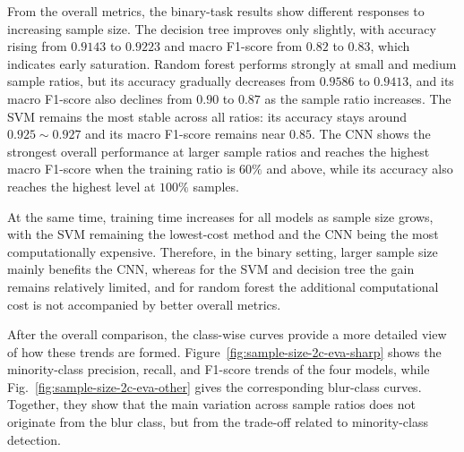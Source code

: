 \par From the overall metrics, the binary-task results show different responses
to increasing sample size. The decision tree improves only slightly, with
accuracy rising from $0.9143$ to $0.9223$ and macro F1-score from $0.82$ to
$0.83$, which indicates early saturation. Random forest performs strongly at
small and medium sample ratios, but its accuracy gradually decreases from
$0.9586$ to $0.9413$, and its macro F1-score also declines from $0.90$ to
$0.87$ as the sample ratio increases. The SVM remains the most stable across
all ratios: its accuracy stays around $0.925\sim0.927$ and its macro F1-score
remains near $0.85$. The CNN shows the strongest overall performance at larger
sample ratios and reaches the highest macro F1-score when the training ratio is
$60\%$ and above, while its accuracy also reaches the highest level at
$100\%$ samples.

\par At the same time, training time increases for all models as sample size
grows, with the SVM remaining the lowest-cost method and the CNN being the
most computationally expensive. Therefore, in the binary setting, larger sample
size mainly benefits the CNN, whereas for the SVM and decision tree the gain
remains relatively limited, and for random forest the additional computational
cost is not accompanied by better overall metrics.

\par After the overall comparison, the class-wise curves provide a more
detailed view of how these trends are formed.
Figure~\ref{fig:sample-size-2c-eva-sharp} shows the minority-class precision,
recall, and F1-score trends of the four models, while
Fig.~\ref{fig:sample-size-2c-eva-other} gives the corresponding blur-class
curves. Together, they show that the main variation across sample ratios does
not originate from the blur class, but from the trade-off related to
minority-class detection.

